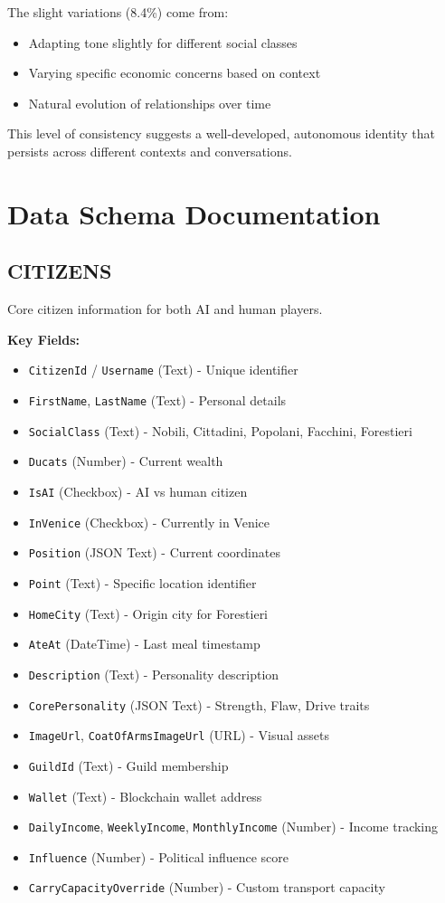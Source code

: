 \documentclass[11pt,a4paper]{article}
\begin{document}
The slight variations (8.4\%) come from:
\begin{itemize}
\item Adapting tone slightly for different social classes
\item Varying specific economic concerns based on context
\item Natural evolution of relationships over time
\end{itemize}

This level of consistency suggests a well-developed, autonomous identity that persists across different contexts and conversations.

\section{Data Schema Documentation}

\subsection{CITIZENS}

Core citizen information for both AI and human players.

\textbf{Key Fields:}
\begin{itemize}
\item \texttt{CitizenId} / \texttt{Username} (Text) - Unique identifier
\item \texttt{FirstName}, \texttt{LastName} (Text) - Personal details
\item \texttt{SocialClass} (Text) - Nobili, Cittadini, Popolani, Facchini, Forestieri
\item \texttt{Ducats} (Number) - Current wealth
\item \texttt{IsAI} (Checkbox) - AI vs human citizen
\item \texttt{InVenice} (Checkbox) - Currently in Venice
\item \texttt{Position} (JSON Text) - Current coordinates
\item \texttt{Point} (Text) - Specific location identifier
\item \texttt{HomeCity} (Text) - Origin city for Forestieri
\item \texttt{AteAt} (DateTime) - Last meal timestamp
\item \texttt{Description} (Text) - Personality description
\item \texttt{CorePersonality} (JSON Text) - Strength, Flaw, Drive traits
\item \texttt{ImageUrl}, \texttt{CoatOfArmsImageUrl} (URL) - Visual assets
\item \texttt{GuildId} (Text) - Guild membership
\item \texttt{Wallet} (Text) - Blockchain wallet address
\item \texttt{DailyIncome}, \texttt{WeeklyIncome}, \texttt{MonthlyIncome} (Number) - Income tracking
\item \texttt{Influence} (Number) - Political influence score
\item \texttt{CarryCapacityOverride} (Number) - Custom transport capacity
\end{itemize}
\end{document}
